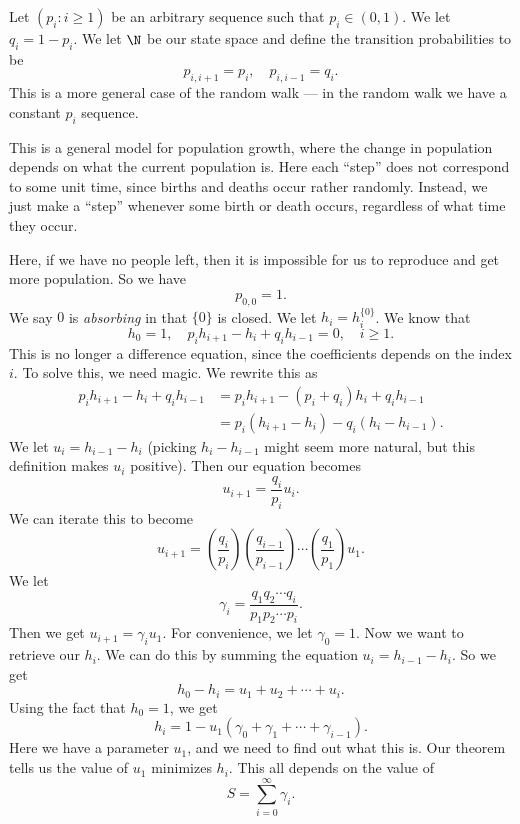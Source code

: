 \documentclass[a4paper]{article}
\begin{document}
\begin{eg}
  Let $(p_i: i \geq 1)$ be an arbitrary sequence such that $p_i \in (0, 1)$. We let $q_i = 1 - p_i$. We let $\N$ be our state space and define the transition probabilities to be
  \[
    p_{i, i + 1} = p_i,\quad p_{i, i - 1} = q_i.
  \]
  This is a more general case of the random walk --- in the random walk we have a constant $p_i$ sequence.

  This is a general model for population growth, where the change in population depends on what the current population is. Here each ``step'' does not correspond to some unit time, since births and deaths occur rather randomly. Instead, we just make a ``step'' whenever some birth or death occurs, regardless of what time they occur.

  Here, if we have no people left, then it is impossible for us to reproduce and get more population. So we have
  \[
    p_{0, 0} = 1.
  \]
  We say $0$ is \emph{absorbing} in that $\{0\}$ is closed. We let $h_i = h_i^{\{0\}}$. We know that
  \[
    h_0 = 1,\quad p_i h_{i + 1} - h_i + q_i h_{i - 1} = 0,\quad i \geq 1.
  \]
  This is no longer a difference equation, since the coefficients depends on the index $i$. To solve this, we need magic. We rewrite this as
  \begin{align*}
    p_i h_{i + 1} - h_i + q_i h_{i - 1} &= p_i h_{i + 1} - (p_i + q_i) h_i + q_i h_{i - 1} \\
    &= p_i (h_{i + 1} - h_i) - q_i(h_i - h_{i - 1}).
  \end{align*}
  We let $u_i = h_{i - 1} - h_i$ (picking $h_i - h_{i - 1}$ might seem more natural, but this definition makes $u_i$ positive). Then our equation becomes
  \[
    u_{i + 1} = \frac{q_i}{p_i} u_i.
  \]
  We can iterate this to become
  \[
    u_{i + 1} = \left(\frac{q_i}{p_i}\right)\left(\frac{q_{i - 1}}{p_{i - 1}}\right) \cdots \left(\frac{q_1}{p_1}\right) u_1.
  \]
  We let
  \[
    \gamma_i = \frac{q_1q_2\cdots q_i}{p_1p_2\cdots p_i}.
  \]
  Then we get $u_{i + 1} = \gamma_i u_1$. For convenience, we let $\gamma_0 = 1$. Now we want to retrieve our $h_i$. We can do this by summing the equation $u_i = h_{i - 1} - h_i$. So we get
  \[
    h_0 - h_i = u_1 + u_2 + \cdots + u_i.
  \]
  Using the fact that $h_0 = 1$, we get
  \[
    h_i = 1 - u_1(\gamma_0 + \gamma_1 + \cdots + \gamma_{i - 1}).
  \]
  Here we have a parameter $u_1$, and we need to find out what this is. Our theorem tells us the value of $u_1$ minimizes $h_i$. This all depends on the value of
  \[
    S = \sum_{i = 0}^\infty \gamma_i.
\]
\end{eg}
\end{document}

